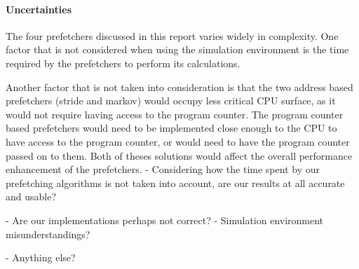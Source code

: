 \paragraph{Uncertainties}
\label{"waiting for reftex-label call..."}
The four prefetchers discussed in this report varies widely in complexity. One factor that is not considered when using the simulation environment is the time required by the prefetchers to perform its calculations. 

Another factor that is not taken into consideration is that the two address based prefetchers (stride and markov) would occupy less critical CPU surface, as it would not require having access to the program counter. The program counter based prefetchers would need to be implemented close enough to the CPU to have access to the program counter, or would need to have the program counter passed on to them. Both of theses solutions would affect the overall performance enhancement of the prefetchers. 
- Considering how the time spent by our prefetching algorithms is not
taken into account, are our results at all accurate and usable?

- Are our implementations perhaps not correct?
- Simulation environment misunderstandings?

- Anything else?
